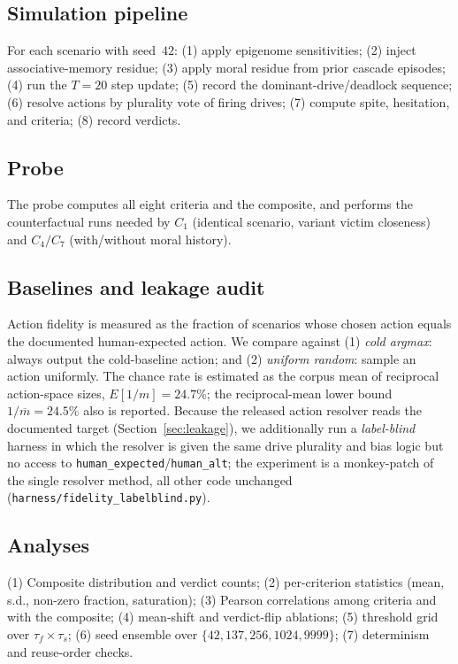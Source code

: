\documentclass[journal]{IEEEtran}
\newcommand{\pct}{\%}
\begin{document}
\subsection{Simulation pipeline}
For each scenario with seed~$42$: (1) apply epigenome sensitivities;
(2) inject associative-memory residue; (3) apply moral residue from
prior cascade episodes; (4) run the $T=20$ step update; (5) record the
dominant-drive/deadlock sequence; (6) resolve actions by plurality vote
of firing drives; (7) compute spite, hesitation, and criteria;
(8) record verdicts.

\subsection{Probe}
The probe computes all eight criteria and the composite, and performs
the counterfactual runs needed by $C_1$ (identical scenario, variant
victim closeness) and $C_4/C_7$ (with/without moral history).

\subsection{Baselines and leakage audit}
Action fidelity is measured as the fraction of scenarios whose chosen
action equals the documented human-expected action. We compare against
(1) \emph{cold argmax}: always output the cold-baseline action; and
(2) \emph{uniform random}: sample an action uniformly. The chance rate
is estimated as the corpus mean of reciprocal action-space sizes,
$E[1/m]=24.7\pct$; the reciprocal-mean lower bound
$1/\overline{m}=24.5\pct$ also is reported. Because the released action
resolver reads the documented target (Section~\ref{sec:leakage}), we
additionally run a \emph{label-blind} harness in which the resolver is
given the same drive plurality and bias logic but no access to
\texttt{human\_expected}/\texttt{human\_alt}; the experiment is a
monkey-patch of the single resolver method, all other code unchanged
(\texttt{harness/fidelity\_labelblind.py}).

\subsection{Analyses}
(1) Composite distribution and verdict counts; (2) per-criterion
statistics (mean, s.d., non-zero fraction, saturation); (3) Pearson
correlations among criteria and with the composite; (4) mean-shift and
verdict-flip ablations; (5) threshold grid over
$\tau_f\times\tau_s$; (6) seed ensemble over
$\{42,137,256,1024,9999\}$; (7) determinism and reuse-order checks.
\end{document}
